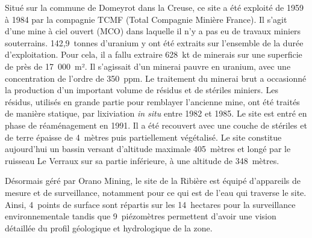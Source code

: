 \documentclass{article}
\begin{document}

Situé sur la commune de Domeyrot dans la Creuse, ce site a été exploité de 1959 à 1984 par la compagnie TCMF (Total Compagnie Minière France). Il s'agit d'une mine à ciel ouvert (MCO) dans laquelle il n'y a pas eu de travaux miniers souterrains. 142,9~tonnes d’uranium y ont été extraits sur l’ensemble de la durée d’exploitation. Pour cela, il a fallu extraire 628~kt de minerais sur une superficie de près de 17~000~m². Il s'agissait d’un minerai pauvre en uranium, avec une concentration de l’ordre de 350~ppm. Le traitement du minerai brut a occasionné la production d'un important volume de résidus et de stériles miniers. Les résidus, utilisés en grande partie pour remblayer l’ancienne mine, ont été traités de manière statique, par lixiviation \textit{in situ} entre 1982 et 1985. Le site est entré en phase de réaménagement en 1991. Il a été recouvert avec une couche de stériles et de terre épaisse de 4~mètres puis partiellement végétalisé. Le site constitue aujourd'hui un bassin versant d’altitude maximale 405~mètres et longé par le ruisseau Le Verraux sur sa partie inférieure, à une altitude de 348~mètres.

Désormais géré par Orano Mining, le site de la Ribière est équipé d'appareils de mesure et de surveillance, notamment pour ce qui est de l’eau qui traverse le site. Ainsi, 4~points de surface sont répartis sur les 14~hectares pour la surveillance environnementale tandis que 9~piézomètres permettent d’avoir une vision détaillée du profil géologique et hydrologique de la zone.
\end{document}
